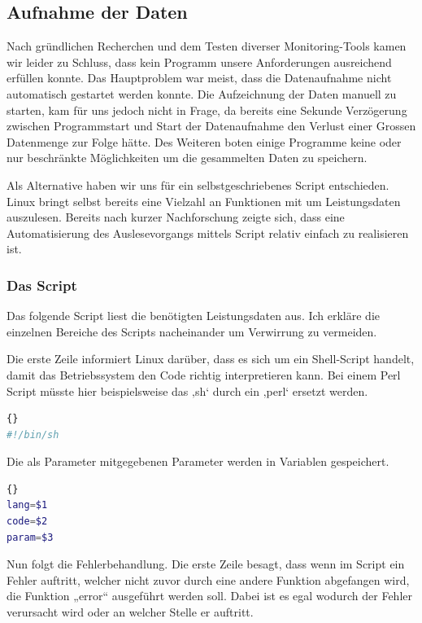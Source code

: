 \documentclass{fancydocument}
\begin{document}
\subsection{Aufnahme der Daten}
Nach gründlichen Recherchen und dem Testen diverser Monitoring-Tools kamen wir leider zu Schluss, dass kein Programm unsere Anforderungen ausreichend erfüllen konnte. Das Hauptproblem war meist, dass die Datenaufnahme nicht automatisch gestartet werden konnte. Die Aufzeichnung der Daten manuell zu starten, kam für uns jedoch nicht in Frage, da bereits eine Sekunde Verzögerung zwischen Programmstart und Start der Datenaufnahme den Verlust einer Grossen Datenmenge zur Folge hätte. Des Weiteren boten einige Programme keine oder  nur beschränkte Möglichkeiten um die gesammelten Daten zu speichern.

Als Alternative haben wir uns für ein selbstgeschriebenes Script entschieden. Linux bringt selbst bereits eine Vielzahl an Funktionen mit um Leistungsdaten auszulesen. Bereits nach kurzer Nachforschung zeigte sich, dass eine Automatisierung des Auslesevorgangs mittels Script relativ einfach zu realisieren ist.

\subsubsection{Das Script}
Das folgende Script liest die benötigten Leistungsdaten aus. Ich erkläre die einzelnen Bereiche des Scripts nacheinander um Verwirrung zu vermeiden.

Die erste Zeile informiert Linux darüber, dass es sich um ein Shell-Script handelt, damit das Betriebssystem den Code richtig interpretieren kann. Bei einem Perl Script müsste hier beispielsweise das ‚sh‘ durch ein ‚perl‘ ersetzt werden.

\begin{minipage}{\textwidth}
\begin{lstlisting}[language=bash,caption=Shebang]{}
#!/bin/sh
\end{lstlisting}
\end{minipage}
Die als Parameter mitgegebenen Parameter werden in Variablen gespeichert.

\begin{minipage}{\textwidth}
\begin{lstlisting}[language=bash,caption=Parameter]{}
lang=$1
code=$2
param=$3
\end{lstlisting}
\end{minipage}

Nun folgt die Fehlerbehandlung.  Die erste Zeile besagt, dass wenn im Script ein Fehler auftritt, welcher nicht zuvor durch eine andere Funktion abgefangen wird, die Funktion „error“ ausgeführt werden soll. Dabei ist es egal wodurch der Fehler verursacht wird oder an welcher Stelle er auftritt.
\end{document}
